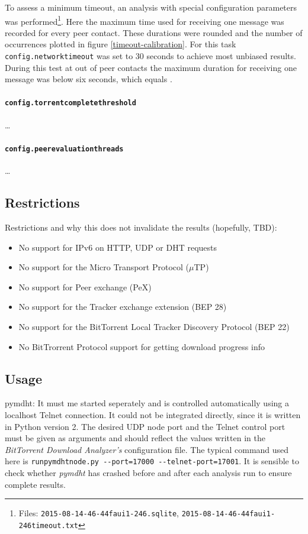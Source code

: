 \documentclass[10pt, a4paper]{scrartcl} %
\renewcommand{\_}{\origunderscore\allowbreak}
\newcommand{\config}[1]{\texttt{config.\allowbreak #1}}
\begin{document}
To assess a minimum timeout, an analysis with special configuration parameters was performed\footnote{Files: \texttt{2015-08-14\_17-46-44\_faui1-246.sqlite}, \texttt{2015-08-14\_17-46-44\_faui1-246\_timeout.txt}}. Here the maximum time used for receiving one message was recorded for every peer contact. These durations were rounded and the number of occurrences plotted in figure \ref{timeout-calibration}. For this task \config{network\_timeout} was set to 30 seconds to achieve most unbiased results. During this test at  out of  peer contacts the maximum duration for receiving one message was below six seconds, which equals .

\paragraph{\config{torrent\_complete\_threshold}}
\dots

\paragraph{\config{peer\_evaluation\_threads}}
\dots

\subsection{Restrictions}

Restrictions and why this does not invalidate the results (hopefully, TBD):

\begin{itemize}
  \item No support for IPv6 on HTTP, UDP or DHT requests
  \item No support for the Micro Transport Protocol ($\mu$TP)
  \item No support for Peer exchange (PeX)
  \item No support for the Tracker exchange extension (BEP 28)
  \item No support for the BitTorrent Local Tracker Discovery Protocol (BEP 22)
  \item No BitTrorrent Protocol support for getting download progress info
\end{itemize}

\subsection{Usage}
pymdht: It must me started seperately and is controlled automatically using a localhost Telnet connection. It could not be integrated directly, since it is written in Python version 2. The desired UDP node port and the Telnet control port must be given as arguments and should reflect the values written in the \emph{BitTorrent Download Analyzer's} configuration file. The typical command used here is \texttt{run\_pymdht\_node.py -{}-port=17000 -{}-telnet-port=17001}. It is sensible to check whether \emph{pymdht} has crashed before and after each analysis run to ensure complete results.
\end{document}
